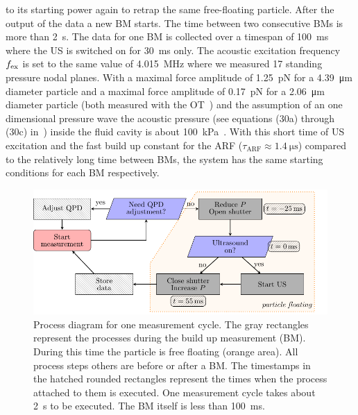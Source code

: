 to its starting power again to retrap the same free-floating particle. After 
the output of the data a new BM starts. The time between two consecutive BMs 
is more than \SI{2}{\s}. The data for one BM is collected over a timespan of 
\SI{100}{\ms} where the US is switched on for \SI{30}{\ms} only. The acoustic 
excitation frequency $f_{\mathrm{ex}}$ is set to the same value of \SI{4.015}{\mega\hertz} 
where we measured 17 standing pressure nodal planes. With a maximal force 
amplitude of \SI{1.25}{\pico\newton} for a \SI{4.39}{\um} diameter particle and 
a maximal force amplitude of \SI{0.17}{\pico\newton} for a \SI{2.06}{\um} 
diameter particle (both measured with the OT~\cite{Goering2021}) and the 
assumption of an one dimensional pressure wave the acoustic pressure (see 
equations (30a) through (30c) in~\cite{Bruus2012}) inside the fluid cavity is 
about \SI{100}{\kilo\pascal}~\cite{Goering2021}. With this short time of US 
excitation and the fast build up constant for the ARF 
($\tau_{\mathrm{ARF}}\approx \SI{1.4}{\us}$) compared to the relatively long 
time between BMs, the system has the same starting conditions for each BM 
respectively.

\begin{figure}[tbp]
  \centering
  \includegraphics[width=\textwidth]{External/PU-flowchart.pdf}
  \caption{Process diagram for one measurement cycle. The gray rectangles 
    represent the processes during the build up measurement (BM). During this 
    time the particle is free floating (orange area). All process steps others 
    are before or after a BM. The timestamps in the hatched rounded 
    rectangles represent the times when the process attached to them is 
    executed. One measurement cycle takes about \SI{2}{\s} to be executed. The 
  BM itself is less than \SI{100}{\ms}.}\label{fig:PU-flowchart}
\end{figure}

